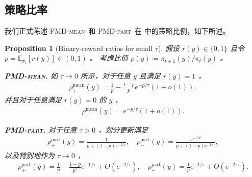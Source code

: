 \documentclass{article}
\theoremstyle{plain}
\newtheorem{proposition}[theorem]{Proposition}
\theoremstyle{definition}
\theoremstyle{remark}
\newcommand{\E}{\mathbb{E}}
\begin{document}
\subsection{策略比率}\label{sec:appendix-ratio}
我们正式陈述 \textsc{PMD-mean}\ 和 \textsc{PMD-part}\ 在  中的策略比例，如下所述。 
\begin{proposition}[Binary-reward ratios for small $\tau$]
\label{prop:binary_ratios}
    假设 $r(y)\in\{0,1\}$ 且令 $p=\E_{\pi_t}[r(y)]\in(0,1)$ 。  
考虑比值 $\rho(y)\coloneqq\pi_{t+1}(y)/\pi_t(y)$ 。

    \noindent\textbf{\textsc{PMD-mean}.}
    如 $\tau\to 0$ 所示，对于任意 $y$ 且满足 $r(y)=1$ ，
    \begin{align*}
        \rho^{\mathrm{mean}}_+(y)
        =\frac{1}{p}-\frac{1-p}{p}e^{-p/\tau}(1+o(1)),
    \end{align*}
    并且对于任意满足 $r(y)=0$ 的 $y$ ，
    \begin{align*}
        \rho^{\mathrm{mean}}_-(y)=e^{-p/\tau}(1+o(1)).
    \end{align*}

    \noindent\textbf{\textsc{PMD-part}.}
    对于任意 $\tau>0$ ，划分更新满足
    \begin{align*}
        \rho^{\mathrm{part}}_+(y)=\frac{1}{p+(1-p)e^{-1/\tau}},
        \quad
        \rho^{\mathrm{part}}_-(y)=\frac{e^{-1/\tau}}{p+(1-p)e^{-1/\tau}},
    \end{align*}
    以及特别地作为 $\tau\to 0$ ，
    \begin{align*}
        \rho^{\mathrm{part}}_+(y)=\frac{1}{p}-\frac{1-p}{p^2}e^{-1/\tau}+O(e^{-2/\tau}),
        \quad
        \rho^{\mathrm{part}}_-(y)=\frac{1}{p}e^{-1/\tau}+O(e^{-2/\tau}).
    \end{align*}
\end{proposition}
\end{document}
